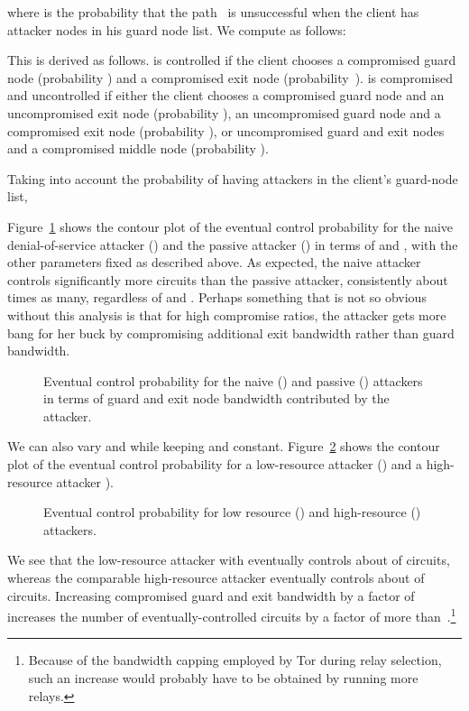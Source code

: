 \documentclass[]{lmcs}
\begin{document}
where  is the probability that the 
path~ is unsuccessful when
the client has  attacker nodes in his guard node list.  We compute
 as follows:

This is derived as follows.   is controlled if
the client chooses a compromised
guard node (probability ) and a compromised exit node
(probability~).   is compromised and uncontrolled if either
the client chooses a compromised guard node and an uncompromised
exit node (probability ), an uncompromised guard node and
a compromised exit node (probability ), or uncompromised
guard and exit nodes and a compromised middle node
(probability ).

Taking into account the probability of having  attackers in
the client's guard-node list,


Figure~\ref{fig:ecp-ge} shows the contour plot of the eventual control
probability for the naive denial-of-service attacker
() and the passive attacker
() in terms of  and ,
with the other parameters fixed as described above.  As expected,
the naive attacker controls significantly more circuits than the
passive attacker, consistently
about  times as many, regardless of  and .  Perhaps something
that is not so obvious without this analysis is that for high
compromise ratios, the attacker gets more bang for her buck by
compromising additional exit bandwidth rather than guard bandwidth.
\begin{figure}
\centering
{}
\caption{\label{fig:ecp-ge}Eventual control probability for the naive
()
and passive 
()
attackers in terms of guard and exit node bandwidth
contributed by the attacker.}
\end{figure}

We can also vary  and  while
keeping  and  constant.  Figure~\ref{fig:ecp-pq} shows the
contour plot of the eventual control probability for a 
low-resource attacker () and a high-resource attacker
).
\begin{figure}
\centering
{}
\caption{\label{fig:ecp-pq}Eventual control probability for 
low resource () and high-resource () attackers.
}
\end{figure}
We see that the low-resource attacker with  eventually controls about  of circuits, whereas
the comparable high-resource attacker eventually controls about
 of circuits. Increasing compromised guard and exit
bandwidth by a factor of~ increases the number of eventually-controlled
circuits by a factor of more than~.\footnote{Because of the 
bandwidth capping employed by Tor during relay selection, such an
increase would probably have to be obtained by running more relays.}
\end{document}
